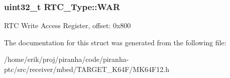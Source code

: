 \subsubsection[{\texorpdfstring{W\+AR}{WAR}}]{ uint32\+\_\+t R\+T\+C\+\_\+\+Type\+::\+W\+AR}\hypertarget{structRTC__Type_a701400edb86bacaa5c19309a90013cc6}{}\label{structRTC__Type_a701400edb86bacaa5c19309a90013cc6}
R\+TC Write Access Register, offset\+: 0x800 

The documentation for this struct was generated from the following file\+:\begin{DoxyCompactItemize}
\item 
/home/erik/proj/piranha/code/piranha-\/ptc/src/receiver/mbed/\+T\+A\+R\+G\+E\+T\+\_\+\+K64\+F/M\+K64\+F12.\+h\end{DoxyCompactItemize}
